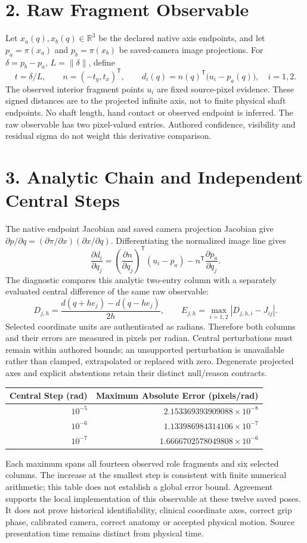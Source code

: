 \documentclass[11pt,a4paper]{article}
\begin{document}
\section*{2. Raw Fragment Observable}
Let $x_a(q),x_b(q)\in\mathbb R^3$ be the declared native axis endpoints,
and let $p_a=\pi(x_a)$ and $p_b=\pi(x_b)$ be saved-camera image projections.
For $\delta=p_b-p_a$, $L=\|\delta\|$, define
\[
 t=\delta/L,\qquad n=(-t_y,t_x)^\mathsf T,\qquad
 d_i(q)=n(q)^\mathsf T\bigl(u_i-p_a(q)\bigr),\quad i=1,2.
\]
The observed interior fragment points $u_i$ are fixed source-pixel evidence.
These signed distances are to the projected infinite axis, not to finite physical
shaft endpoints. No shaft length, hand contact or observed endpoint is inferred.
The raw observable has two pixel-valued entries. Authored confidence, visibility
and residual sigma do not weight this derivative comparison.

\newpage
\section*{3. Analytic Chain and Independent Central Steps}
The native endpoint Jacobian and saved camera projection Jacobian give
$\partial p/\partial q=(\partial\pi/\partial x)(\partial x/\partial q)$.
Differentiating the normalized image line gives
\[
 \frac{\partial d_i}{\partial q_j}
 =\left(\frac{\partial n}{\partial q_j}\right)^\mathsf T(u_i-p_a)
 -n^\mathsf T\frac{\partial p_a}{\partial q_j}.
\]
The diagnostic compares this analytic two-entry column with a separately
evaluated central difference of the same raw observable:
\[
 D_{j,h}=\frac{d(q+h e_j)-d(q-h e_j)}{2h},\qquad
 E_{j,h}=\max_{i=1,2}|D_{j,h,i}-J_{ij}|.
\]
Selected coordinate units are authenticated as radians. Therefore both columns
and their errors are measured in pixels per radian. Central perturbations must
remain within authored bounds; an unsupported perturbation is unavailable rather
than clamped, extrapolated or replaced with zero. Degenerate projected axes and
explicit abstentions retain their distinct null/reason contracts.

\begin{center}
\begin{tabular}{@{}rr@{}}\toprule
Central Step (rad) & Maximum Absolute Error (pixels/rad)\\\midrule
$10^{-5}$ & $2.153369393909088\times10^{-8}$\\
$10^{-6}$ & $1.133986984314106\times10^{-7}$\\
$10^{-7}$ & $1.6666702578049808\times10^{-6}$\\\bottomrule
\end{tabular}\end{center}
Each maximum spans all fourteen observed role fragments and six selected columns.
The increase at the smallest step is consistent with finite numerical arithmetic;
this table does not establish a global error bound. Agreement supports the local
implementation of this observable at these twelve saved poses. It does not prove
historical identifiability, clinical coordinate axes, correct grip phase, calibrated
camera, correct anatomy or accepted physical motion. Source presentation time
remains distinct from physical time.
\end{document}
